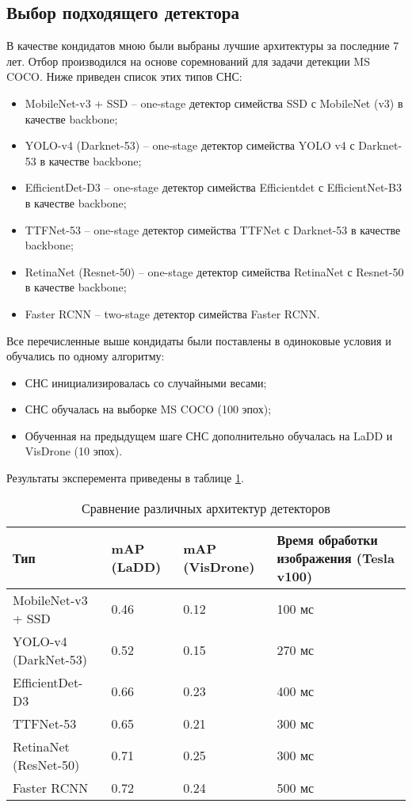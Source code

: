 \subsection{Выбор подходящего детектора}

В качестве кондидатов мною были выбраны лучшие архитектуры за последние 7 лет. Отбор производился на основе соремнований для задачи детекции MS COCO. Ниже приведен список этих типов СНС:
\begin{itemize}
    \item MobileNet-v3 + SSD -- one-stage детектор симейства SSD с MobileNet (v3) в качестве backbone;
    \item YOLO-v4 (Darknet-53) -- one-stage детектор симейства YOLO v4 с Darknet-53 в качестве backbone;
    \item EfficientDet-D3 -- one-stage детектор симейства Efficientdet с EfficientNet-B3 в качестве backbone;
    \item TTFNet-53 -- one-stage детектор симейства TTFNet с Darknet-53 в качестве backbone;
    \item RetinaNet (Resnet-50) -- one-stage детектор симейства RetinaNet с Resnet-50 в качестве backbone;
    \item Faster RCNN -- two-stage детектор симейства Faster RCNN.
\end{itemize}

Все перечисленные выше кондидаты были поставлены в одиноковые условия и обучались по одному алгоритму:
\begin{itemize}
    \item СНС инициализировалась со случайными весами;
    \item СНС обучалась на выборке MS COCO (100 эпох);
    \item Обученная на предыдущем шаге СНС дополнительно обучалась на LaDD и VisDrone (10 эпох).
\end{itemize}

Результаты эксперемента приведены в таблице \ref{leaderboard-table}.

\begin{table}[H]
  \caption{Сравнение различных архитектур детекторов}\label{leaderboard-table}
  \begin{tabular}{|p{4cm}|p{3cm}|p{3cm}|p{5cm}|}
    \hline
    {Тип} & {mAP (LaDD)} & {mAP (VisDrone)} & {Время обработки изображения (Tesla v100)} \\
    \hline
    MobileNet-v3 + SSD & 0.46 & 0.12 & 100 мс \\
    \hline
    YOLO-v4 (DarkNet-53) & 0.52 & 0.15 & 270 мс \\
    \hline
    EfficientDet-D3 & 0.66 & 0.23 & 400 мс \\
    \hline
    TTFNet-53 & 0.65 & 0.21 & 300 мс \\
    \hline
    RetinaNet (ResNet-50) & 0.71 & 0.25 & 300 мс \\
    \hline 
    Faster RCNN & 0.72 & 0.24 & 500 мс \\
    \hline
  \end{tabular}
\end{table}

